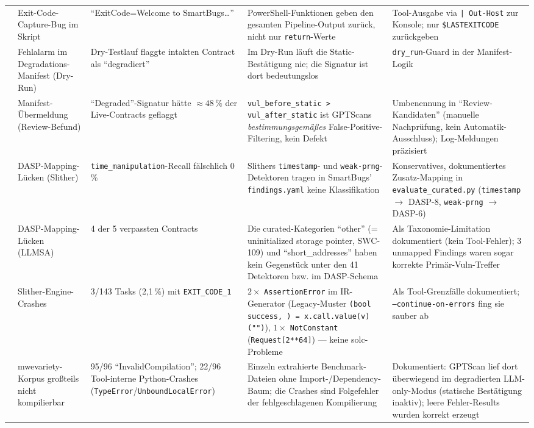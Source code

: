 \documentclass[11pt,a4paper]{scrartcl}
\newcommand{\code}[1]{\texttt{#1}}
\begin{document}
{\begin{longtable}{@{}L{0.5cm} L{2.4cm} L{3.0cm} L{4.4cm} L{4.0cm}@{}}
 & Exit-Code-Capture-Bug im Skript & \enquote{ExitCode=Welcome to SmartBugs\dots} & PowerShell-Funktionen geben den gesamten Pipeline-Output zurück, nicht nur \code{return}-Werte & Tool-Ausgabe via \code{|\,Out-Host} zur Konsole; nur \code{\$LASTEXITCODE} zurückgeben \\
 & Fehlalarm im Degradations-Manifest (Dry-Run) & Dry-Testlauf flaggte intakten Contract als \enquote{degradiert} & Im Dry-Run läuft die Static-Bestätigung nie; die Signatur ist dort bedeutungslos & \code{dry\_run}-Guard in der Manifest-Logik \\
 & Manifest-Übermeldung (Review-Befund) & \enquote{Degraded}-Signatur hätte ${\approx}48\,\%$ der Live-Contracts geflaggt & \code{vul\_before\_static > vul\_after\_static} ist GPTScans \emph{bestimmungsgemäßes} False-Positive-Filtering, kein Defekt & Umbenennung in \enquote{Review-Kandidaten} (manuelle Nachprüfung, kein Automatik-Ausschluss); Log-Meldungen präzisiert \\
 & DASP-Mapping-Lücken (Slither) & \code{time\_manipulation}-Recall fälschlich 0\,\% & Slithers \code{timestamp}- und \code{weak-prng}-Detektoren tragen in SmartBugs' \code{findings.yaml} keine Klassifikation & Konservatives, dokumentiertes Zusatz-Mapping in \code{evaluate\_curated.py} (\code{timestamp} $\rightarrow$ DASP-8, \code{weak-prng} $\rightarrow$ DASP-6) \\
 & DASP-Mapping-Lücken (LLMSA) & 4 der 5 verpassten Contracts & Die curated-Kategorien \enquote{other} (= uninitialized storage pointer, SWC-109) und \enquote{short\_addresses} haben kein Gegenstück unter den 41 Detektoren bzw. im DASP-Schema & Als Taxonomie-Limitation dokumentiert (kein Tool-Fehler); 3 unmapped Findings waren sogar korrekte Primär-Vuln-Treffer \\
 & Slither-Engine-Crashes & 3/143 Tasks (2{,}1\,\%) mit \code{EXIT\_CODE\_1} & $2\times$ \code{AssertionError} im IR-Generator (Legacy-Muster \code{(bool success, ) = x.call.value(v)("")}), $1\times$ \code{NotConstant} (\code{Request[2**64]}) --- keine solc-Probleme & Als Tool-Grenzfälle dokumentiert; \code{--continue-on-errors} fing sie sauber ab \\
 & mwevariety-Korpus großteils nicht kompilierbar & 95/96 \enquote{InvalidCompilation}; 22/96 Tool-interne Python-Crashes (\code{TypeError}/\code{UnboundLocalError}) & Einzeln extrahierte Benchmark-Dateien ohne Import-/Dependency-Baum; die Crashes sind Folgefehler der fehlgeschlagenen Kompilierung & Dokumentiert: GPTScan lief dort überwiegend im degradierten LLM-only-Modus (statische Bestätigung inaktiv); leere Fehler-Results wurden korrekt erzeugt \\

\end{longtable}}
\end{document}
